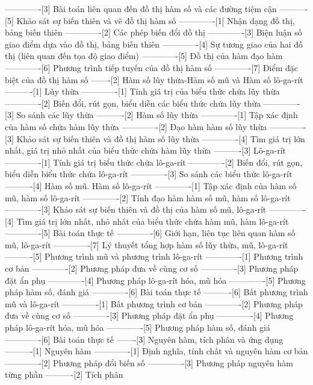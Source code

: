 -------------[3] Bài toán liên quan đến đồ thị hàm số và các đường tiệm cận
----------[5] Khảo sát sự biến thiên và vẽ đồ thị hàm số
-------------[1] Nhận dạng đồ thị, bảng biến thiên
-------------[2] Các phép biến đổi đồ thị
-------------[3] Biện luận số giao điểm dựa vào đồ thị, bảng biến thiên
-------------[4] Sự tương giao của hai đồ thị (liên quan đến tọa độ giao điểm)
-------------[5] Đồ thị của hàm đạo hàm
-------------[6] Phương trình tiếp tuyến của đồ thị hàm số
-------------[7] Điểm đặc biệt của đồ thị hàm số
-------[2] Hàm số lũy thừa-Hàm số mũ và Hàm số lô-ga-rít
----------[1] Lũy thừa
-------------[1] Tính giá trị của biểu thức chứa lũy thừa
-------------[2] Biến đổi, rút gọn, biểu diễn các biểu thức chứa lũy thừa
-------------[3] So sánh các lũy thừa
----------[2] Hàm số lũy thừa
-------------[1] Tập xác định của hàm số chứa hàm lũy thừa
-------------[2] Đạo hàm hàm số lũy thừa
-------------[3] Khảo sát sự biến thiên và đồ thị hàm số lũy thừa
-------------[4] Tìm giá trị lớn nhất, giá trị nhỏ nhất của biểu thức chứa hàm lũy thừa
----------[3] Lô-ga-rít
-------------[1] Tính giá trị biểu thức chứa lô-ga-rít
-------------[2] Biến đổi, rút gọn, biểu diễn biểu thức chứa lô-ga-rít
-------------[3] So sánh các biểu thức lô-ga-rít
----------[4] Hàm số mũ. Hàm số lô-ga-rít
-------------[1] Tập xác định của hàm số mũ, hàm số lô-ga-rít
-------------[2] Tính đạo hàm hàm số mũ, hàm số lô-ga-rít
-------------[3] Khảo sát sự biến thiên và đồ thị của hàm số mũ, lô-ga-rít
-------------[4] Tìm giá trị lớn nhất, nhỏ nhất của biểu thức chứa hàm mũ, hàm lô-ga-rít
-------------[5] Bài toán thực tế
-------------[6] Giới hạn, liên tục liên quan hàm số mũ, lô-ga-rít
-------------[7] Lý thuyết tổng hợp hàm số lũy thừa, mũ, lô-ga-rít
----------[5] Phương trình mũ và phương trình lô-ga-rít
-------------[1] Phương trình cơ bản
-------------[2] Phương pháp đưa về cùng cơ số
-------------[3] Phương pháp đặt ẩn phụ
-------------[4] Phương pháp lô-ga-rít hóa, mũ hóa
-------------[5] Phương pháp hàm số, đánh giá
-------------[6] Bài toán thực tế
----------[6] Bất phương trình mũ và lô-ga-rít
-------------[1] Bất phương trình cơ bản
-------------[2] Phương pháp đưa về cùng cơ số
-------------[3] Phương pháp đặt ẩn phụ
-------------[4] Phương pháp lô-ga-rít hóa, mũ hóa
-------------[5] Phương pháp hàm số, đánh giá
-------------[6] Bài toán thực tế
-------[3] Nguyên hàm, tích phân và ứng dụng
----------[1] Nguyên hàm
-------------[1] Định nghĩa, tính chất và nguyên hàm cơ bản
-------------[2] Phương pháp đổi biến số
-------------[3] Phương pháp nguyên hàm từng phần
----------[2] Tích phân
